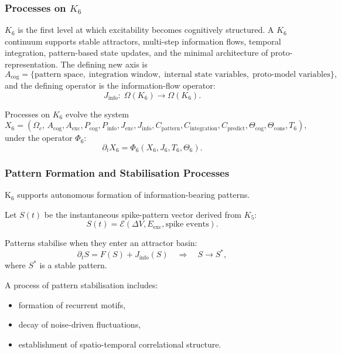 

\subsubsection{Processes on \texorpdfstring{$K_6$}{K_6}}
\label{sec:processes-k6}

$K_6$ is the first level at which excitability becomes cognitively
structured. A $K_6$ continuum supports stable attractors,
multi-step information flows, temporal integration,
pattern-based state updates, and the minimal architecture of
proto-representation. The defining new axis is
\[
A_{\text{cog}} =
\{\text{pattern space},\;
\text{integration window},\;
\text{internal state variables},\;
\text{proto-model variables}\},
\]
and the defining operator is the information-flow operator:
\[
J_{\text{info}}:\; \Omega(K_6)\to\Omega(K_6).
\]

Processes on $K_6$ evolve the system
\[
X_6 =
(\Omega_c,\, A_{\text{cog}}, A_{\text{exc}},
P_{\text{cog}}, P_{\text{info}},
J_{\text{exc}}, J_{\text{info}},
C_{\text{pattern}}, C_{\text{integration}},
C_{\text{predict}},
\Theta_{\text{cog}}, \Theta_{\text{cons}},
T_6),
\]
under the operator $\Phi_6$:
\[
\partial_t X_6 = \Phi_6(X_6, J_6, T_6, \Theta_6).
\]

\subsubsection{Pattern Formation and Stabilisation Processes}

K$_6$ supports autonomous formation of information-bearing patterns.

Let $S(t)$ be the instantaneous spike-pattern vector derived from $K_5$:
\[
S(t)=\mathcal{E}(\Delta V, E_{\text{exc}},\text{spike\ events}).
\]

Patterns stabilise when they enter an attractor basin:
\[
\partial_t S = F(S) + J_{\text{info}}(S)
\quad\Rightarrow\quad
S \to S^\ast,
\]
where $S^\ast$ is a stable pattern.

A process of pattern stabilisation includes:
\begin{itemize}
    \item formation of recurrent motifs,
    \item decay of noise-driven fluctuations,
    \item establishment of spatio-temporal correlational structure.
\end{itemize}

